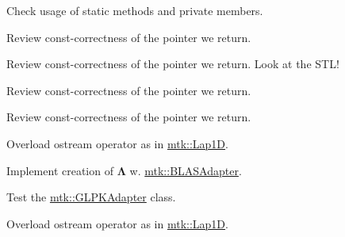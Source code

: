 \begin{DoxyRefList}
\item[\label{todo__todo000024}%
\hypertarget{todo__todo000024}{}%
Member \hyperlink{classmtk_1_1Tools_a04a60458594336ee1badff79b8a9a77f}{mtk\+:\+:Tools\+:\+:test\+\_\+number\+\_\+} ]Check usage of static methods and private members.  
\item[\label{todo__todo000008}%
\hypertarget{todo__todo000008}{}%
Member \hyperlink{classmtk_1_1UniStgGrid1D_aa1999580cb98c19950e951510871cc90}{mtk\+:\+:Uni\+Stg\+Grid1\+D\+:\+:discrete\+\_\+domain\+\_\+x} () const ]Review const-\/correctness of the pointer we return.  
\item[\label{todo__todo000009}%
\hypertarget{todo__todo000009}{}%
Member \hyperlink{classmtk_1_1UniStgGrid1D_acf28d702f6e702599986afcb253bbfc1}{mtk\+:\+:Uni\+Stg\+Grid1\+D\+:\+:discrete\+\_\+field\+\_\+u} ()]Review const-\/correctness of the pointer we return. Look at the S\+T\+L!  
\item[\label{todo__todo000011}%
\hypertarget{todo__todo000011}{}%
Member \hyperlink{classmtk_1_1UniStgGrid2D_ab2f70cf5cd0a2d5486992d9f2f8baa4a}{mtk\+:\+:Uni\+Stg\+Grid2\+D\+:\+:discrete\+\_\+domain\+\_\+x} () const ]Review const-\/correctness of the pointer we return.  
\item[\label{todo__todo000012}%
\hypertarget{todo__todo000012}{}%
Member \hyperlink{classmtk_1_1UniStgGrid2D_ac33a58d65105550dcf6f6b92b48b5105}{mtk\+:\+:Uni\+Stg\+Grid2\+D\+:\+:discrete\+\_\+domain\+\_\+y} () const ]Review const-\/correctness of the pointer we return.  
\item[\label{todo__todo000016}%
\hypertarget{todo__todo000016}{}%
File \hyperlink{mtk__div__1d_8cc}{mtk\+\_\+div\+\_\+1d.cc} ]Overload ostream operator as in \hyperlink{classmtk_1_1Lap1D}{mtk\+::\+Lap1\+D}.

Implement creation of $ \mathbf{\Lambda}$ w. \hyperlink{classmtk_1_1BLASAdapter}{mtk\+::\+B\+L\+A\+S\+Adapter}.  
\item[\label{todo__todo000025}%
\hypertarget{todo__todo000025}{}%
File \hyperlink{mtk__glpk__adapter__test_8cc}{mtk\+\_\+glpk\+\_\+adapter\+\_\+test.cc} ]Test the \hyperlink{classmtk_1_1GLPKAdapter}{mtk\+::\+G\+L\+P\+K\+Adapter} class.  
\item[\label{todo__todo000018}%
\hypertarget{todo__todo000018}{}%
File \hyperlink{mtk__grad__1d_8cc}{mtk\+\_\+grad\+\_\+1d.cc} ]Overload ostream operator as in \hyperlink{classmtk_1_1Lap1D}{mtk\+::\+Lap1\+D}.


\end{DoxyRefList}
